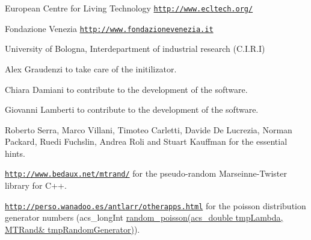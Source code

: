 \begin{DoxyItemize}
\item European Centre for Living Technology \href{http://www.ecltech.org/}{\tt http\-://www.\-ecltech.\-org/}
\item Fondazione Venezia \href{http://www.fondazionevenezia.it}{\tt http\-://www.\-fondazionevenezia.\-it}
\item University of Bologna, Interdepartment of industrial research (C.\-I.\-R.\-I)
\item Alex Graudenzi to take care of the initilizator.
\item Chiara Damiani to contribute to the development of the software.
\item Giovanni Lamberti to contribute to the development of the software.
\item Roberto Serra, Marco Villani, Timoteo Carletti, Davide De Lucrezia, Norman Packard, Ruedi Fuchslin, Andrea Roli and Stuart Kauffman for the essential hints.
\item \href{http://www.bedaux.net/mtrand/}{\tt http\-://www.\-bedaux.\-net/mtrand/} for the pseudo-\/random Marseinne-\/\-Twister library for C++.
\item \href{http://perso.wanadoo.es/antlarr/otherapps.html}{\tt http\-://perso.\-wanadoo.\-es/antlarr/otherapps.\-html} for the poisson distribution generator numbers (acs\-\_\-long\-Int \hyperlink{a00059_a22cddb6ffcf2250e0c90bc913728350f}{random\-\_\-poisson(acs\-\_\-double tmp\-Lambda, M\-T\-Rand\& tmp\-Random\-Generator)}). 
\end{DoxyItemize}